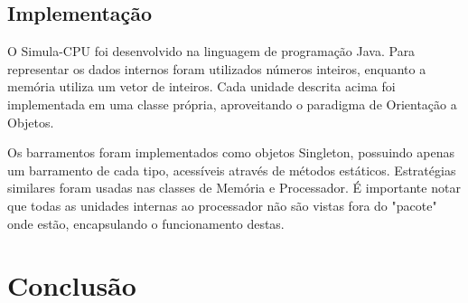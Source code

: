 \documentclass[
	12pt,				%
	oneside,			%
	a4paper,			%
	english,			%
	french,				%
	spanish,			%
	brazil,				%
	]{abntex2}
\begin{document}
{\section{Implementação}
O Simula-CPU foi desenvolvido na linguagem de programação Java. Para
representar os dados internos foram utilizados números inteiros, enquanto
a memória utiliza um vetor de inteiros. Cada unidade descrita acima foi
implementada em uma classe própria, aproveitando o paradigma de Orientação a
Objetos.

Os barramentos foram implementados como objetos Singleton, possuindo apenas um
barramento de cada tipo, acessíveis através de métodos estáticos. Estratégias
similares foram usadas nas classes de Memória e Processador. É importante notar
que todas as unidades internas ao processador não são vistas fora do "pacote"
onde estão, encapsulando o funcionamento destas.






%

\chapter*[Conclusão]{Conclusão}

\postextual



%
%



}
\end{document}
